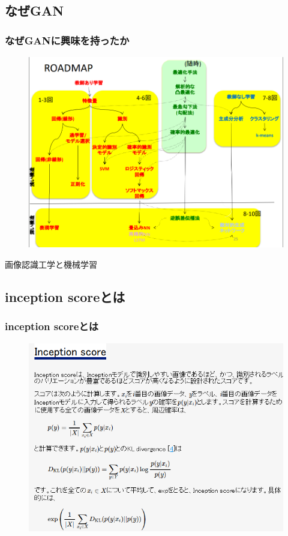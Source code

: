 \documentclass[dvipdfmx,12pt]{beamer}
\begin{document}
\subsection{なぜGAN}
\begin{frame}
	\frametitle{なぜGANに興味を持ったか}
	\begin{figure}[htbp]
	\begin{center}
	\includegraphics[width=0.7\hsize]{./road_map.png}
	\end{center}
	\end{figure}
	画像認識工学と機械学習
\end{frame}

\subsection{inception scoreとは}
\begin{frame}
	\frametitle{inception scoreとは}
	\begin{figure}[htbp]
	\begin{center}
	\includegraphics[width=\hsize]{./inception_score_discription.png}
	\end{center}
	\end{figure}
\end{frame}
\end{document}
